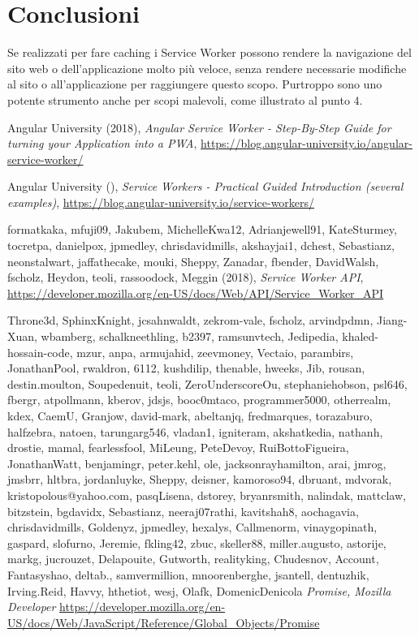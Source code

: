 \documentclass[11pt ,a4paper , twoside , openright ]{article}
\begin{document}
\section{Conclusioni}
Se realizzati per fare caching i Service Worker possono rendere la navigazione del sito web o dell'applicazione molto più veloce, senza rendere necessarie modifiche al sito o all'applicazione per raggiungere questo scopo. 
Purtroppo sono uno potente strumento anche per scopi malevoli, come illustrato al punto 4.
\newpage
\listoffigures
\newpage
\begin{thebibliography}{99}
	\bibitem{}
	Angular University (2018),
	\emph{Angular Service Worker - Step-By-Step Guide for turning your Application into a PWA},
	\url{https://blog.angular-university.io/angular-service-worker/}
	
	\bibitem{}
	Angular University (),
	\emph{Service Workers - Practical Guided Introduction (several examples)},
	\url{https://blog.angular-university.io/service-workers/}
	
	\bibitem{}
	formatkaka, mfuji09, Jakubem, MichelleKwa12, Adrianjewell91, KateSturmey, tocretpa, danielpox, jpmedley, chrisdavidmills, akshayjai1, dchest, Sebastianz, neonstalwart, jaffathecake, mouki, Sheppy, Zanadar, fbender, DavidWalsh, fscholz, Heydon, teoli, rassoodock, Meggin (2018),
	\emph{Service Worker API},
	\url{https://developer.mozilla.org/en-US/docs/Web/API/Service_Worker_API}
	
	\bibitem{}
	Throne3d, SphinxKnight, jcsahnwaldt, zekrom-vale, fscholz, arvindpdmn, Jiang-Xuan, wbamberg, schalkneethling, b2397, ramsunvtech, Jedipedia, khaled-hossain-code, mzur, anpa, armujahid, zeevmoney, Vectaio, parambirs, JonathanPool, rwaldron, 6112, kushdilip, thenable, hweeks, Jib, rousan, destin.moulton, Soupedenuit, teoli, ZeroUnderscoreOu, stephaniehobson, psl646, fbergr, atpollmann, kberov, jdsjs, booc0mtaco, programmer5000, otherrealm, kdex, CaemU, Granjow, david-mark, abeltanjq, fredmarques, torazaburo, halfzebra, natoen, tarungarg546, vladan1, igniteram, akshatkedia, nathanh, drostie, mamal, fearlessfool, MiLeung, PeteDevoy, RuiBottoFigueira, JonathanWatt, benjamingr, peter.kehl, ole, jacksonrayhamilton, arai, jmrog, jmsbrr, hltbra, jordanluyke, Sheppy, deisner, kamoroso94, dbruant, mdvorak, kristopolous@yahoo.com, pasqLisena, dstorey, bryanrsmith, nalindak, mattclaw, bitzstein, bgdavidx, Sebastianz, neeraj07rathi, kavitshah8, aochagavia, chrisdavidmills, Goldenyz, jpmedley, hexalys, Callmenorm, vinaygopinath, gaspard, slofurno, Jeremie, fkling42, zbuc, skeller88, miller.augusto, astorije, markg, jucrouzet, Delapouite, Gutworth, realityking, Chudesnov, Account, Fantasyshao, deltab., samvermillion, mnoorenberghe, jsantell, dentuzhik, Irving.Reid, Havvy, hthetiot, wesj, Olafk, DomenicDenicola
	\emph{Promise, Mozilla Developer}
	\url{https://developer.mozilla.org/en-US/docs/Web/JavaScript/Reference/Global_Objects/Promise}
	

\end{thebibliography}
\end{document}
